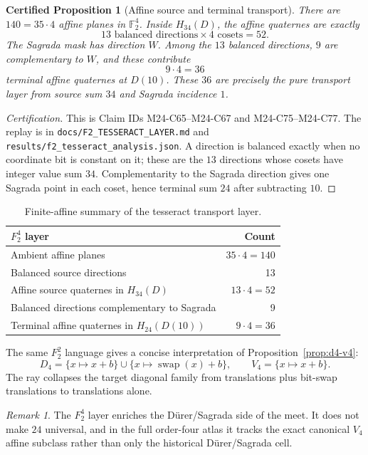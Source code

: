 \documentclass[11pt,a4paper]{article}
\newtheorem{certprop}[theorem]{Certified Proposition}
\theoremstyle{definition}
\theoremstyle{remark}
\newtheorem{remark}[theorem]{Remark}
\newcommand{\F}{\mathbb F}
\newcommand{\Durer}{D\"urer\xspace}
\begin{document}
\begin{certprop}[Affine source and terminal transport]
\label{prop:f2-transport}
There are \(140=35\cdot4\) affine planes in \(\F_2^4\).  Inside
\(H_{34}(D)\), the affine quaternes are exactly
\[
13\text{ balanced directions}\times4\text{ cosets}=52.
\]
The Sagrada mask has direction \(W\).  Among the \(13\) balanced directions,
\(9\) are complementary to \(W\), and these contribute
\[
9\cdot4=36
\]
terminal affine quaternes at \(D(10)\).  These \(36\) are precisely the pure
transport layer from source sum \(34\) and Sagrada incidence \(1\).
\end{certprop}

\begin{proof}[Certification]
This is Claim IDs M24-C65--M24-C67 and M24-C75--M24-C77.  The replay is in
\texttt{docs/F2\_TESSERACT\_LAYER.md} and
\texttt{results/f2\_tesseract\_analysis.json}.  A direction is balanced
exactly when no coordinate bit is constant on it; these are the \(13\)
directions whose cosets have integer value sum \(34\).  Complementarity to
the Sagrada direction gives one Sagrada point in each coset, hence terminal
sum \(24\) after subtracting \(10\).
\end{proof}

\begin{table}[htbp]
\centering
\begin{tabular}{lr}
\toprule
\(F_2^4\) layer & Count\\
\midrule
Ambient affine planes & \(35\cdot4=140\)\\
Balanced source directions & 13\\
Affine source quaternes in \(H_{34}(D)\) & \(13\cdot4=52\)\\
Balanced directions complementary to Sagrada & 9\\
Terminal affine quaternes in \(H_{24}(D(10))\) & \(9\cdot4=36\)\\
\bottomrule
\end{tabular}
\caption{Finite-affine summary of the tesseract transport layer.}
\label{tab:f2-transport}
\end{table}

The same \(F_2^2\) language gives a concise interpretation of
Proposition~\ref{prop:d4-v4}:
\[
D_4=\{x\mapsto x+b\}\cup\{x\mapsto \operatorname{swap}(x)+b\},
\qquad
V_4=\{x\mapsto x+b\}.
\]
The ray collapses the target diagonal family from translations plus
bit-swap translations to translations alone.

\begin{remark}
The \(F_2^4\) layer enriches the \Durer/Sagrada side of the meet.  It does
not make \(24\) universal, and in the full order-four atlas it tracks the
exact canonical \(V_4\) affine subclass rather than only the historical
\Durer/Sagrada cell.
\end{remark}
\end{document}
